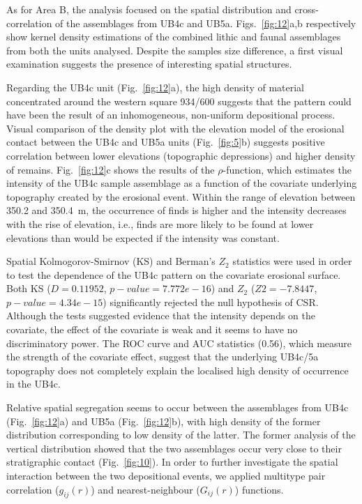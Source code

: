 \documentclass[preprint,authoryear,times]{elsarticle} %
\begin{document}

As for Area B, the analysis focused on the spatial distribution and cross-correlation of the assemblages from UB4c and UB5a. Figs.~\ref{fig:12}a,b respectively show kernel density estimations of the combined lithic and faunal assemblages from both the units analysed. Despite the samples size difference, a first visual examination suggests the presence of interesting spatial structures.

Regarding the UB4c unit (Fig.~\ref{fig:12}a), the high density of material concentrated around the western square 934/600 suggests that the pattern could have been the result of an inhomogeneous, non-uniform depositional process. Visual comparison of the density plot with the elevation model of the erosional contact between the UB4c and UB5a units (Fig.~\ref{fig:5}b) suggests positive correlation between lower elevations (topographic depressions) and higher density of remains. Fig.~\ref{fig:12}c shows the results of the $\rho$-function, which estimates the intensity of the UB4c sample assemblage as a function of the covariate underlying topography created by the erosional event. Within the range of elevation between 350.2 and 350.4~m, the occurrence of finds is higher and the intensity decreases with the rise of elevation, i.e., finds are more likely to be found at lower elevations than would be expected if the intensity was constant.

Spatial Kolmogorov-Smirnov (KS) and Berman's $Z_2$ \citep{Berman1986} statistics were used in order to test the dependence of the UB4c pattern on the covariate erosional surface. Both KS ($D=0.11952$, $p-value=7.772e-16$) and $Z_2$ ($Z2=-7.8447$, $p-value=4.34e-15$) significantly rejected the null hypothesis of CSR. Although the tests suggested evidence that the intensity depends on the covariate, the effect of the covariate is weak and it seems to have no discriminatory power. The ROC curve and AUC statistics (0.56), which measure the strength of the covariate effect, suggest that the underlying UB4c/5a topography does not completely explain the localised high density of occurrence in the UB4c.

Relative spatial segregation seems to occur between the assemblages from UB4c (Fig.~\ref{fig:12}a) and UB5a (Fig.~\ref{fig:12}b), with high density of the former distribution corresponding to low density of the latter. The former analysis of the vertical distribution showed that the two assemblages occur very close to their stratigraphic contact (Fig.~\ref{fig:10}). In order to further investigate the spatial interaction between the two depositional events, we applied multitype pair correlation ($g_{ij}(r)$) and nearest-neighbour ($G_{ij}(r)$) functions.
\end{document}
